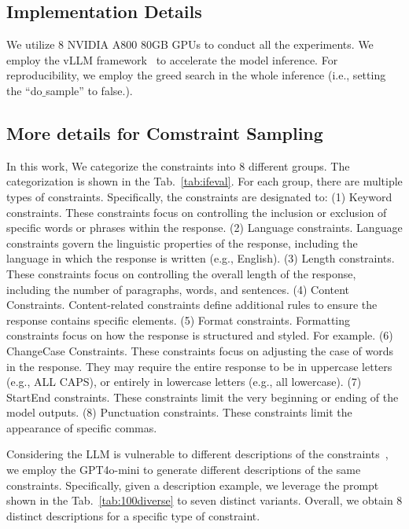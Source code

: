 \subsection{Implementation Details}
We utilize 8 NVIDIA A800 80GB GPUs to conduct all the experiments. We employ the vLLM framework~\cite{kwon2023efficient} to accelerate the model inference. For reproducibility, we employ the greed search in the whole inference (i.e., setting the ``do$\_$sample'' to false.).


\subsection{More details for Comstraint Sampling} \label{appx:cons_tax}
In this work, We categorize the constraints into 8 different groups. The categorization is shown in the Tab.~\ref{tab:ifeval}. For each group, there are multiple types of constraints. Specifically, the constraints are designated to: (1) Keyword constraints. These constraints focus on controlling the inclusion or exclusion of specific words or phrases within the response. (2) Language constraints. Language constraints govern the linguistic properties of the response, including the language in which the response is written (e.g., English). (3) Length constraints. These constraints focus on controlling the overall length of the response, including the number of paragraphs, words, and sentences. (4) Content Constraints. Content-related constraints define additional rules to ensure the response contains specific elements. (5) Format constraints. Formatting constraints focus on how the response is structured and styled. For example. (6) ChangeCase Constraints. These constraints focus on adjusting the case of words in the response. They may require the entire response to be in uppercase letters (e.g., ALL CAPS), or entirely in lowercase letters (e.g., all lowercase). (7) StartEnd constraints. These constraints limit the very beginning or ending of the model outputs. (8) Punctuation constraints. These constraints limit the appearance of specific commas.



Considering the LLM is vulnerable to different descriptions of the constraints~\cite{yan2024contrastive}, we employ the GPT4o-mini to generate different descriptions of the same constraints. Specifically, given a description example, we leverage the prompt shown in the Tab.~\ref{tab:100diverse} to seven distinct variants. Overall, we obtain 8 distinct descriptions for a specific type of constraint.

